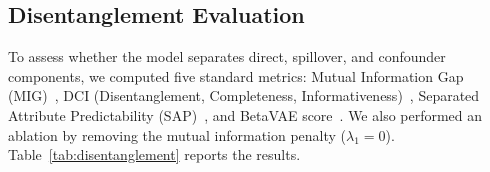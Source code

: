 \documentclass[conference]{IEEEtran}
\begin{document}
\subsection{Disentanglement Evaluation}
To assess whether the model separates direct, spillover, and confounder components, we computed five standard metrics: Mutual Information Gap (MIG)~\cite{chen2018isolating}, DCI (Disentanglement, Completeness, Informativeness)~\cite{eastwood2018framework}, Separated Attribute Predictability (SAP)~\cite{kumar2018variational}, and BetaVAE score~\cite{higgins2017betavae}. We also performed an ablation by removing the mutual information penalty ($\lambda_1=0$). Table~\ref{tab:disentanglement} reports the results.

\begin{table}[htbp]
\centering
\caption{Disentanglement metrics for full model (with MI penalty) and ablation (without MI penalty). Higher scores indicate better separation.}\label{tab:disentanglement}
\end{table}
\end{document}
